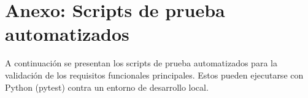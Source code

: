 \section{Anexo: Scripts de prueba automatizados}

A continuación se presentan los scripts de prueba automatizados para la validación de los requisitos funcionales principales. Estos pueden ejecutarse con Python (pytest) contra un entorno de desarrollo local.

